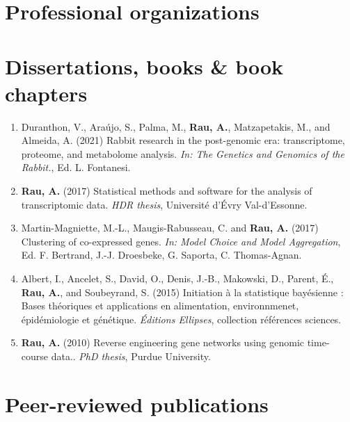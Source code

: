 \documentclass[11pt, a4paper]{awesome-cv}
\providecommand{\tightlist}{%
	\setlength{\itemsep}{0pt}\setlength{\parskip}{0pt}}
\begin{document}
\hypertarget{professional-organizations}{%
\section{Professional organizations}\label{professional-organizations}}

\begin{cvhonors}
\end{cvhonors}

\hypertarget{dissertations-books-book-chapters}{%
\section{Dissertations, books \& book
chapters}\label{dissertations-books-book-chapters}}

\begin{enumerate}
\def\labelenumi{\arabic{enumi}.}
\tightlist
\item
  Duranthon, V., Araújo, S., Palma, M., \textbf{Rau, A.}, Matzapetakis,
  M., and Almeida, A. (2021) Rabbit research in the post-genomic era:
  transcriptome, proteome, and metabolome analysis. \emph{In: The
  Genetics and Genomics of the Rabbit.}, Ed. L. Fontanesi.
\item
  \textbf{Rau, A.} (2017) Statistical methods and software for the
  analysis of transcriptomic data. \emph{HDR thesis}, Université d'Évry
  Val-d'Essonne.
\item
  Martin-Magniette, M.-L., Maugis-Rabusseau, C. and \textbf{Rau, A.}
  (2017) Clustering of co-expressed genes. \emph{In: Model Choice and
  Model Aggregation}, Ed. F. Bertrand, J.-J. Droesbeke, G. Saporta, C.
  Thomas-Agnan.
\item
  Albert, I., Ancelet, S., David, O., Denis, J.-B., Makowski, D.,
  Parent, É., \textbf{Rau, A.}, and Soubeyrand, S. (2015) Initiation à
  la statistique bayésienne : Bases théoriques et applications en
  alimentation, environnmenet, épidémiologie et génétique.
  \emph{Éditions Ellipses}, collection références sciences.
\item
  \textbf{Rau, A.} (2010) Reverse engineering gene networks using
  genomic time-course data.. \emph{PhD thesis}, Purdue University.
\end{enumerate}

\hypertarget{peer-reviewed-publications}{%
\section{Peer-reviewed publications}\label{peer-reviewed-publications}}
\end{document}
